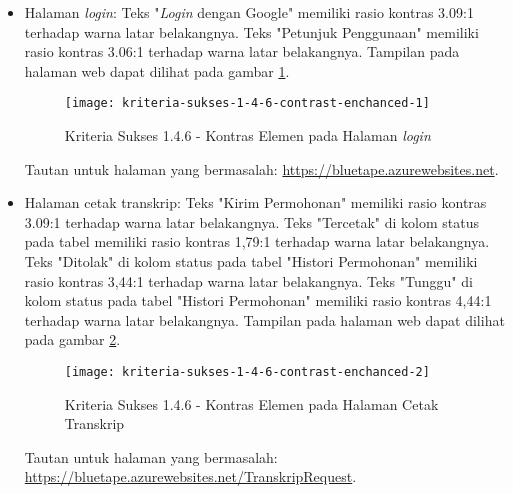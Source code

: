 \begin{itemize}
    \item Halaman \textit{login}: Teks "\textit{Login} dengan Google" memiliki rasio kontras 3.09:1 terhadap warna latar belakangnya. Teks "Petunjuk Penggunaan" memiliki rasio kontras 3.06:1 terhadap warna latar belakangnya. Tampilan pada halaman web dapat dilihat pada gambar \ref{fig:1.4.6_contrast_enchanced_1}.
    \begin{figure}[H]
        \centering  
        \texttt{[image: kriteria-sukses-1-4-6-contrast-enchanced-1]}  
        \caption[Kriteria Sukses 1.4.6 - Kontras Elemen pada Halaman \textit{login}]{Kriteria Sukses 1.4.6 - Kontras Elemen pada Halaman \textit{login}}
        \label{fig:1.4.6_contrast_enchanced_1}  
    \end{figure} 
    Tautan untuk halaman yang bermasalah: \url{https://bluetape.azurewebsites.net}.

    \item Halaman cetak transkrip: Teks "Kirim Permohonan" memiliki rasio kontras 3.09:1 terhadap warna latar belakangnya. Teks "Tercetak" di kolom status pada tabel memiliki rasio kontras 1,79:1 terhadap warna latar belakangnya. Teks "Ditolak" di kolom status pada tabel "Histori Permohonan" memiliki rasio kontras 3,44:1 terhadap warna latar belakangnya. Teks "Tunggu" di kolom status pada tabel "Histori Permohonan" memiliki rasio kontras 4,44:1 terhadap warna latar belakangnya. Tampilan pada halaman web dapat dilihat pada gambar \ref{fig:1.4.6_contrast_enchanced_2}.
    \begin{figure}[H]
        \centering  
        \texttt{[image: kriteria-sukses-1-4-6-contrast-enchanced-2]}  
        \caption[Kriteria Sukses 1.4.6 - Kontras Elemen pada Halaman Cetak Transkrip]{Kriteria Sukses 1.4.6 - Kontras Elemen pada Halaman Cetak Transkrip}
        \label{fig:1.4.6_contrast_enchanced_2}  
    \end{figure} 
    Tautan untuk halaman yang bermasalah: \url{https://bluetape.azurewebsites.net/TranskripRequest}.


\end{itemize}
